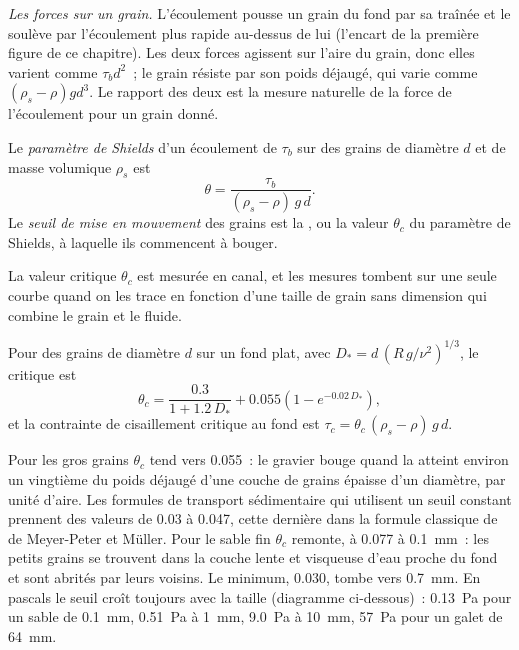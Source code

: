 \emph{Les forces sur un grain.} L'écoulement pousse un grain du fond par sa traînée et
le soulève par l'écoulement plus rapide au-dessus de lui (l'encart de la première figure de ce
chapitre). Les deux forces agissent sur l'aire du grain, donc elles varient comme $\tau_b
d^2$~; le grain résiste par son poids déjaugé, qui varie comme
$(\rho_s - \rho) g d^3$. Le rapport des deux est la mesure naturelle de la
force de l'écoulement pour un grain donné.

\begin{definition}\label{def:b1:erosion-transport:threshold}
Le \emph{paramètre de Shields} d'un écoulement de 
$\tau_b$ sur des grains de diamètre $d$ et de masse volumique $\rho_s$ est
\[
  \theta = \frac{\tau_b}{(\rho_s - \rho)\,g\,d}.
\]
Le \emph{seuil de mise en mouvement} des grains est la
, ou la valeur $\theta_c$ du paramètre de Shields, à laquelle
ils commencent à bouger.
\end{definition}

La valeur critique $\theta_c$ est mesurée en canal, et les mesures tombent
sur une seule courbe quand on les trace en fonction d'une taille de grain sans dimension qui
combine le grain et le fluide.

\begin{proposition}\label{prop:b1:erosion-transport:soulsby}
Pour des grains de diamètre $d$ sur un fond plat, avec
$D_* = d\,\left(R\,g/\nu^2\right)^{1/3}$, le  critique est
\[
  \theta_c = \frac{0.3}{1 + 1.2\,D_*} + 0.055\left(1 - e^{-0.02\,D_*}\right),
\]
et la contrainte de cisaillement critique au fond est $\tau_c = \theta_c\,(\rho_s - \rho)\,g\,d$.
\end{proposition}
\admitted

Pour les gros grains $\theta_c$ tend vers \num{0.055}~: le gravier bouge quand la  atteint environ un vingtième du poids déjaugé d'une couche de
grains épaisse d'un diamètre, par unité d'aire. Les formules de transport sédimentaire qui
utilisent un seuil constant prennent des valeurs de \num{0.03} à \num{0.047}, cette
dernière dans la formule classique de  de Meyer-Peter et Müller. Pour le sable fin $\theta_c$ remonte, à
\num{0.077} à \qty{0.1}{mm}~: les petits grains se trouvent dans la couche lente et visqueuse
d'eau proche du fond et sont abrités par leurs voisins. Le minimum,
\num{0.030}, tombe vers \qty{0.7}{mm}. En pascals le seuil croît toujours
avec la taille (diagramme ci-dessous)~: \qty{0.13}{Pa} pour un sable de \qty{0.1}{mm},
\qty{0.51}{Pa} à \qty{1}{mm}, \qty{9.0}{Pa} à \qty{10}{mm}, \qty{57}{Pa} pour un
galet de \qty{64}{mm}.

